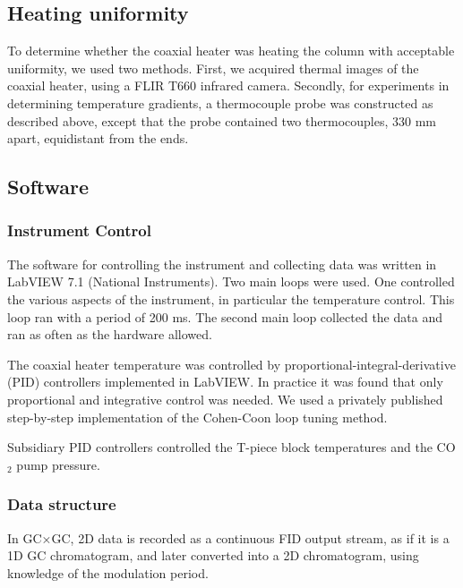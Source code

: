 \documentclass[aip,rsi,preprint,graphicx]{revtex4-1} %
\begin{document}
\subsection{Heating uniformity}

To determine whether the coaxial heater was heating the column with acceptable
uniformity, we used two methods. First, we acquired thermal images of the
coaxial heater, using a FLIR T660 infrared camera. Secondly, for experiments in
determining temperature gradients, a thermocouple probe was constructed as
described above, except that the probe contained two thermocouples, 330 mm
apart, equidistant from the ends.

\subsection{Software}

\subsubsection{Instrument Control}
The software for controlling the instrument and collecting data was written in
LabVIEW 7.1\texttrademark{} (National Instruments).
Two main loops were used. One controlled the various aspects of the instrument,
in particular the temperature control. This loop ran with a  period of 200 ms.
The second main loop collected the data and ran as often as the hardware
allowed.

The coaxial heater temperature was controlled by
proportional-integral-derivative (PID) controllers implemented in LabVIEW. In
practice it was found that only proportional and integrative control was needed.
We used a privately published\cite{Peacock2008} step-by-step implementation of
the Cohen-Coon loop tuning method.

Subsidiary PID controllers controlled the T-piece block temperatures and the
CO$_2$ pump pressure.


\subsubsection{Data structure}
In GC×GC, 2D data is recorded as a continuous FID output stream, as if it
is a 1D GC chromatogram, and later converted into a 2D chromatogram, using
knowledge of the modulation period.
\end{document}
